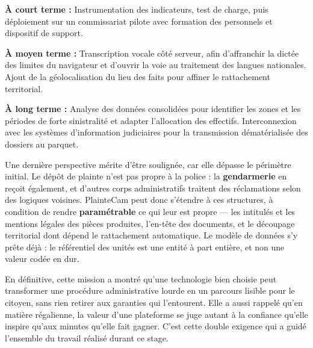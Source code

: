 \textbf{À court terme :} Instrumentation des indicateurs, test de charge, puis déploiement sur un commissariat pilote avec formation des personnels et dispositif de support.

\textbf{À moyen terme :} Transcription vocale côté serveur, afin d'affranchir la dictée des limites du navigateur et d'ouvrir la voie au traitement des langues nationales. Ajout de la géolocalisation du lieu des faits pour affiner le rattachement territorial.

\textbf{À long terme :} Analyse des données consolidées pour identifier les zones et les périodes de forte sinistralité et adapter l'allocation des effectifs. Interconnexion avec les systèmes d'information judiciaires pour la transmission dématérialisée des dossiers au parquet.

\medskip

Une dernière perspective mérite d'être soulignée, car elle dépasse le périmètre initial. Le dépôt de plainte n'est pas propre à la police : la \textbf{gendarmerie} en reçoit également, et d'autres corps administratifs traitent des réclamations selon des logiques voisines. PlainteCam peut donc s'étendre à ces structures, à condition de rendre \textbf{paramétrable} ce qui leur est propre — les intitulés et les mentions légales des pièces produites, l'en-tête des documents, et le découpage territorial dont dépend le rattachement automatique. Le modèle de données s'y prête déjà : le référentiel des unités est une entité à part entière, et non une valeur codée en dur.

\medskip

En définitive, cette mission a montré qu'une technologie bien choisie peut transformer une procédure administrative lourde en un parcours lisible pour le citoyen, sans rien retirer aux garanties qui l'entourent. Elle a aussi rappelé qu'en matière régalienne, la valeur d'une plateforme se juge autant à la confiance qu'elle inspire qu'aux minutes qu'elle fait gagner. C'est cette double exigence qui a guidé l'ensemble du travail réalisé durant ce stage.
